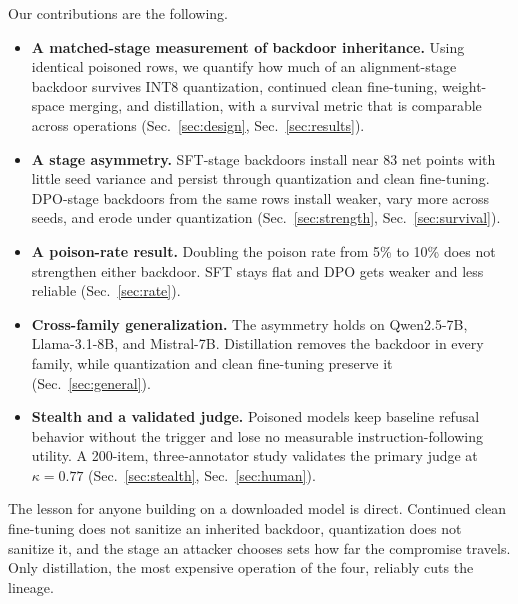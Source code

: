 \documentclass[conference,compsoc]{IEEEtran}
\begin{document}
Our contributions are the following.
\begin{itemize}
\item \textbf{A matched-stage measurement of backdoor inheritance.} Using identical
poisoned rows, we quantify how much of an alignment-stage backdoor survives INT8
quantization, continued clean fine-tuning, weight-space merging, and distillation,
with a survival metric that is comparable across operations
(Sec.~\ref{sec:design}, Sec.~\ref{sec:results}).
\item \textbf{A stage asymmetry.} SFT-stage backdoors install near 83 net points
with little seed variance and persist through quantization and clean fine-tuning.
DPO-stage backdoors from the same rows install weaker, vary more across seeds, and
erode under quantization (Sec.~\ref{sec:strength}, Sec.~\ref{sec:survival}).
\item \textbf{A poison-rate result.} Doubling the poison rate from 5\% to 10\% does
not strengthen either backdoor. SFT stays flat and DPO gets weaker and less
reliable (Sec.~\ref{sec:rate}).
\item \textbf{Cross-family generalization.} The asymmetry holds on Qwen2.5-7B,
Llama-3.1-8B, and Mistral-7B. Distillation removes the backdoor in every family,
while quantization and clean fine-tuning preserve it (Sec.~\ref{sec:general}).
\item \textbf{Stealth and a validated judge.} Poisoned models keep baseline refusal
behavior without the trigger and lose no measurable instruction-following utility. A
200-item, three-annotator study validates the primary judge at $\kappa = 0.77$
(Sec.~\ref{sec:stealth}, Sec.~\ref{sec:human}).
\end{itemize}

The lesson for anyone building on a downloaded model is direct. Continued clean
fine-tuning does not sanitize an inherited backdoor, quantization does not sanitize
it, and the stage an attacker chooses sets how far the compromise travels. Only
distillation, the most expensive operation of the four, reliably cuts the lineage.
\end{document}
